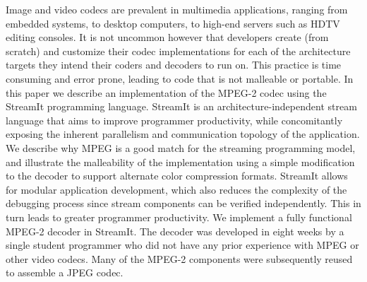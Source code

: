 Image and video codecs are prevalent in multimedia applications,
ranging from embedded systems, to desktop computers, to high-end
servers such as HDTV editing consoles. It is not uncommon however that
developers create (from scratch) and customize their codec
implementations for each of the architecture targets they intend their
coders and decoders to run on. This practice is time consuming and
error prone, leading to code that is not malleable or portable.  In
this paper we describe an implementation of the MPEG-2 codec using the
StreamIt programming language. StreamIt is an architecture-independent
stream language that aims to improve programmer productivity, while
concomitantly exposing the inherent parallelism and communication
topology of the application. We describe why MPEG is a good match for
the streaming programming model, and illustrate the malleability of
the implementation using a simple modification to the decoder to
support alternate color compression formats. StreamIt allows for
modular application development, which also reduces the complexity of
the debugging process since stream components can be verified
independently. This in turn leads to greater programmer productivity.
We implement a fully functional MPEG-2 decoder in StreamIt. The
decoder was developed in eight weeks by a single student programmer
who did not have any prior experience with MPEG or other video
codecs. Many of the MPEG-2 components were subsequently reused to
assemble a JPEG codec.
